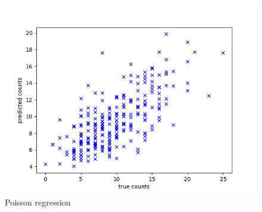 \begin{answer}
    \begin{figure}[H]
        \includegraphics[width=\textwidth]{../src/poisson/poisson.png}
        \caption{Poisson regression}
    \end{figure}
\end{answer}

